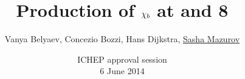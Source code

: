 \title{Production of $\chi_{b}$ at  and 8\tev}
\author{Vanya Belyaev, Concezio Bozzi, Hans Dijkstra, \underline{Sasha Mazurov}}
\date{ICHEP approval session\\6 June 2014}
